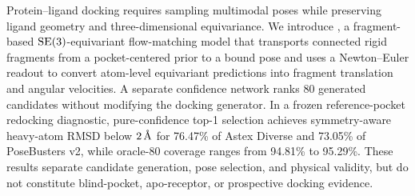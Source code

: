 Protein--ligand docking requires sampling multimodal poses while preserving
ligand geometry and three-dimensional equivariance. We introduce \method, a
fragment-based \(\mathrm{SE}(3)\)-equivariant flow-matching model that transports
connected rigid fragments from a pocket-centered prior to a bound pose and
uses a Newton--Euler readout to convert atom-level equivariant predictions
into fragment translation and angular velocities. A separate confidence
network ranks 80 generated candidates without modifying the docking
generator. In a frozen reference-pocket redocking diagnostic, pure-confidence
top-1 selection achieves symmetry-aware heavy-atom RMSD below
\(2\,\text{\normalfont\AA}\) for 76.47\% of Astex Diverse and 73.05\% of PoseBusters v2,
while oracle-80 coverage ranges from 94.81\% to 95.29\%. These results separate
candidate generation, pose selection, and
physical validity, but do not constitute blind-pocket, apo-receptor, or
prospective docking evidence.
